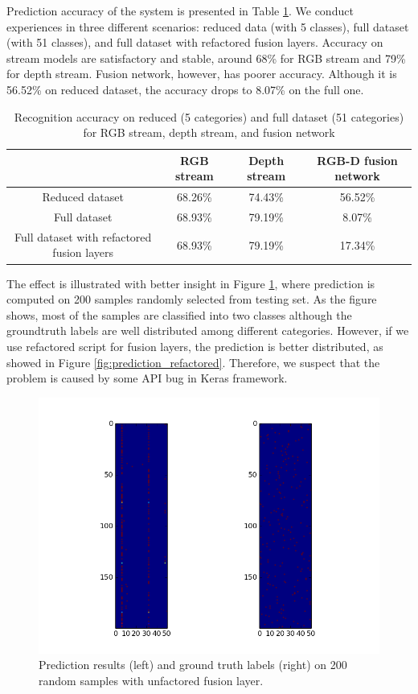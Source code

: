 Prediction accuracy of the system is presented in Table \ref{tab:result}. We conduct experiences in three different scenarios: reduced data (with 5 classes), full dataset (with 51 classes), and full dataset with refactored fusion layers. Accuracy on stream models are satisfactory and stable, around 68\% for RGB stream and 79\% for depth stream. Fusion network, however, has poorer accuracy. Although it is 56.52\% on reduced dataset, the accuracy drops to 8.07\% on the full one. 

\begin{table}[htbp]
	\centering
	\caption{Recognition accuracy on reduced (5 categories) and full dataset (51 categories) for RGB stream, depth stream, and fusion network}
	\label{tab:result}
	\begin{tabular}{|c|c|c|c|}
		\hline
		& RGB stream & Depth stream & RGB-D fusion network \\ \hline
		Reduced dataset & 68.26\% & 74.43\% & 56.52\% \\ 
		Full dataset & 68.93\% & 79.19\% & 8.07\% \\ 
		Full dataset with refactored fusion layers & 68.93\% & 79.19\% & 17.34\% \\ \hline
	\end{tabular}
\end{table}

The effect is illustrated with better insight in Figure \ref{fig:prediction}, where prediction is computed on 200 samples randomly selected from testing set. As the figure shows, most of the samples are classified into two classes although the groundtruth labels are well distributed among different categories. However, if we use refactored script for fusion layers, the prediction is better distributed, as showed in Figure \ref{fig:prediction_refactored}. Therefore, we suspect that the problem is caused by some API bug in Keras framework.

\begin{figure}[htbp]
	\centering
	\includegraphics[width=\textwidth]{img/prediction.png}
	\caption{Prediction results (left) and ground truth labels (right) on 200 random samples with unfactored fusion layer.}
	\label{fig:prediction}
\end{figure}

